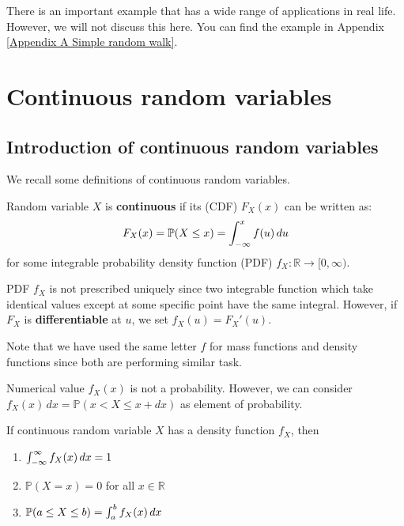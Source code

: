 \documentclass{huhtakm-template-book}
\newcommand{\prob}{\mathbb{P}}
\begin{document}
There is an important example that has a wide range of applications in real life. However, we will not discuss this here. You can find the example in Appendix \ref{Appendix A Simple random walk}.

\chapter{Continuous random variables}
\section{Introduction of continuous random variables}
We recall some definitions of continuous random variables.
\begin{defn}
	Random variable $X$ is \textbf{continuous} if its  (CDF) $F_{X}(x)$ can be written as:
	\begin{equation*}
		F_{X}(x)=\prob(X\leq x)=\intlu{-\infty}{x}f(u)\,du
	\end{equation*}
	for some integrable probability density function (PDF) $f_{X}:\mathbb{R}\to[0,\infty)$.
\end{defn}
\begin{rem}
	PDF $f_{X}$ is not prescribed uniquely since two integrable function which take identical values except at some specific point have the same integral. However, if $F_{X}$ is \textbf{differentiable} at $u$, we set $f_{X}(u)=F_{X}'(u)$.
\end{rem}
Note that we have used the same letter $f$ for mass functions and density functions since both are performing similar task.
\begin{rem}
	Numerical value $f_{X}(x)$ is not a probability. However, we can consider $f_{X}(x)\,dx=\prob(x<X\leq x+dx)$ as element of probability.
\end{rem}
\begin{lem}
	\label{Chapter 5 (Lemma) Properties of PDF}
	If continuous random variable $X$ has a density function $f_{X}$, then
	\begin{enumerate}
		\item $\int_{-\infty}^{\infty} f_{X}(x)\,dx=1$
		\item $\prob(X=x)=0$ for all $x\in\mathbb{R}$
		\item $\prob(a\leq X\leq b)=\intlu{a}{b}f_{X}(x)\,dx$
	\end{enumerate}
\end{lem}
\end{document}
